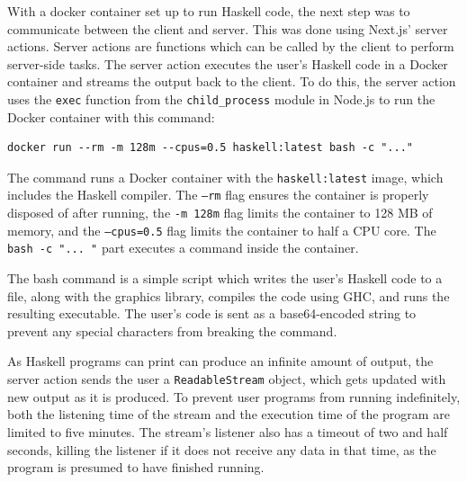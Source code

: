 \documentclass[../main.tex]{subfiles}
\begin{document}
                    With a docker container set up to run Haskell code, the next step was to
                        communicate between the client and server.
                    This was done using Next.js' server actions.
                    Server actions are functions which can be called by the client to perform
                        server-side tasks.
                    The server action executes the user's Haskell code in a Docker container and
                        streams the output back to the client.
                    To do this, the server action uses the \texttt{exec} function from the
                        \texttt{child\_process} module in Node.js to run the Docker container with this
                        command: \begin{verbatim}
docker run --rm -m 128m --cpus=0.5 haskell:latest bash -c "..."\end{verbatim}

                        The command runs a Docker
                        container with the \texttt{haskell:latest} image, which includes the Haskell
                        compiler.
                    The \texttt{--rm} flag ensures the container is properly disposed of after
                        running, the \texttt{-m 128m} flag limits the container to 128 MB of memory,
                        and the \texttt{--cpus=0.5} flag limits the container to half a CPU core.
                    The \texttt{bash -c "...
                    "} part executes a command inside the container.

                    The bash command is a simple script which writes the user's Haskell code to a
                        file, along with the graphics library, compiles the code using GHC, and runs
                        the resulting executable.
                    The user's code is sent as a base64-encoded string to prevent any special
                        characters from breaking the command.

                    As Haskell programs can print can produce an infinite amount of output, the
                        server action sends the user a \texttt{ReadableStream} object, which gets
                        updated with new output as it is produced.
                    To prevent user programs from running indefinitely, both the listening time of
                        the stream and the execution time of the program are limited to five minutes.
                    The stream's listener also has a timeout of two and half seconds, killing the
                        listener if it does not receive any data in that time, as the program is
                        presumed to have finished running.
\end{document}
